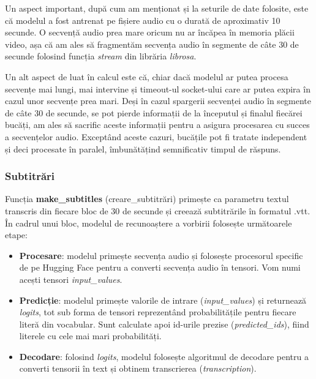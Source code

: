 \par
Un aspect important, după cum am menționat și la seturile de date folosite, este că modelul a fost
antrenat pe fișiere audio cu o durată de aproximativ 10 secunde. O secvență audio prea mare oricum
nu ar încăpea în memoria plăcii video, așa că am ales să fragmentăm secvența audio în segmente de câte 30 de
secunde folosind funcția \textit{stream} din librăria \textit{librosa}.

\par
Un alt aspect de luat în calcul este că, chiar dacă modelul ar putea procesa secvențe mai lungi, mai
intervine și timeout-ul socket-ului care ar putea expira în cazul unor secvențe prea mari. Deși în
cazul spargerii secvenței audio în segmente de câte 30 de secunde, se pot pierde informații de 
la începutul și finalul fiecărei bucăți, am ales să sacrific aceste informații pentru a asigura
procesarea cu succes a secvențelor audio. Exceptând aceste cazuri, bucățile pot fi tratate independent
și deci procesate în paralel, îmbunătățind semnificativ timpul de răspuns.

\subsubsection{Subtitrări}
\label{subsec:subtitles}
\par
Funcția \textbf{make\_subtitles} (creare\_subtitrări) primește ca parametru textul transcris din fiecare bloc de 30 de secunde
și creează subtitrările în formatul .vtt. În cadrul unui bloc, modelul de recunoaștere a vorbirii 
folosește următoarele etape:
\begin{itemize}
    \item \textbf{Procesare}: modelul primește secvența audio și folosește procesorul specific de pe
    Hugging Face pentru a converti secvența audio în tensori. Vom numi acești tensori \textit{input\_values}.
    \item \textbf{Predicție}: modelul primește valorile de intrare (\textit{input\_values}) și returnează \textit{logits}, tot
    sub forma de tensori reprezentând probabilitățile pentru fiecare literă din vocabular. Sunt calculate
    apoi id-urile prezise (\textit{predicted\_ids}), fiind literele cu cele mai mari probabilități.
    \item \textbf{Decodare}: folosind \textit{logits}, modelul folosește algoritmul de decodare pentru a
    converti tensorii în text și obtinem transcrierea (\textit{transcription}).
\end{itemize}


